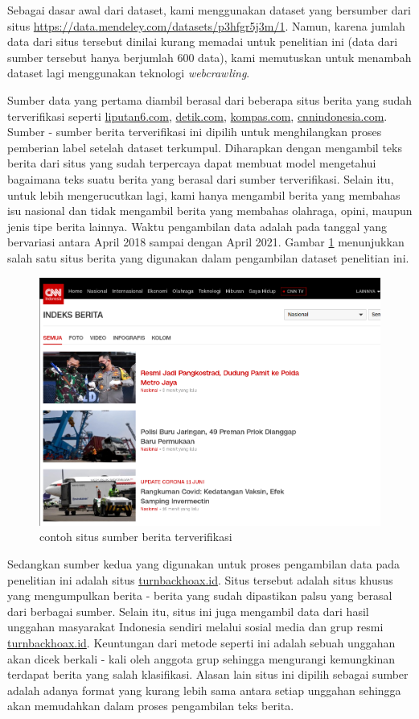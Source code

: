 Sebagai dasar awal dari dataset, kami menggunakan dataset yang bersumber dari situs \url{https://data.mendeley.com/datasets/p3hfgr5j3m/1}. Namun, karena jumlah data dari situs tersebut dinilai kurang memadai untuk penelitian ini (data dari sumber tersebut hanya berjumlah 600 data), kami memutuskan untuk menambah dataset lagi menggunakan teknologi \textit{webcrawling}.

Sumber data yang pertama diambil berasal dari beberapa situs berita yang sudah terverifikasi seperti \url{liputan6.com}, \url{detik.com}, \url{kompas.com}, \url{cnnindonesia.com}. Sumber - sumber berita terverifikasi ini dipilih untuk menghilangkan proses pemberian label setelah dataset terkumpul. Diharapkan dengan mengambil teks berita dari situs yang sudah terpercaya dapat membuat model mengetahui bagaimana teks suatu berita yang berasal dari sumber terverifikasi. Selain itu, untuk lebih mengerucutkan lagi, kami hanya mengambil berita yang membahas isu nasional dan tidak mengambil berita yang membahas olahraga, opini, maupun jenis tipe berita lainnya. Waktu pengambilan data adalah pada tanggal yang bervariasi antara April 2018 sampai dengan April 2021. Gambar \ref{fig: news_source} menunjukkan salah satu situs berita yang digunakan dalam pengambilan dataset penelitian ini.

\begin{figure}[h!]
  \begin{center}
    \includegraphics[width= .9\linewidth]{gambar/cnn_news.png}
    \caption{contoh situs sumber berita terverifikasi}
    \label{fig: news_source}
  \end{center}
\end{figure}

Sedangkan sumber kedua yang digunakan untuk proses pengambilan data pada penelitian ini adalah situs \url{turnbackhoax.id}. Situs tersebut adalah situs khusus yang mengumpulkan berita - berita yang sudah dipastikan palsu yang berasal dari berbagai sumber. Selain itu, situs ini juga mengambil data dari hasil unggahan masyarakat Indonesia sendiri melalui sosial media dan grup resmi \url{turnbackhoax.id}. Keuntungan dari metode seperti ini adalah sebuah unggahan akan dicek berkali - kali oleh anggota grup sehingga mengurangi kemungkinan terdapat berita yang salah klasifikasi. Alasan lain situs ini dipilih sebagai sumber adalah adanya format yang kurang lebih sama antara setiap unggahan sehingga akan memudahkan dalam proses pengambilan teks berita.

